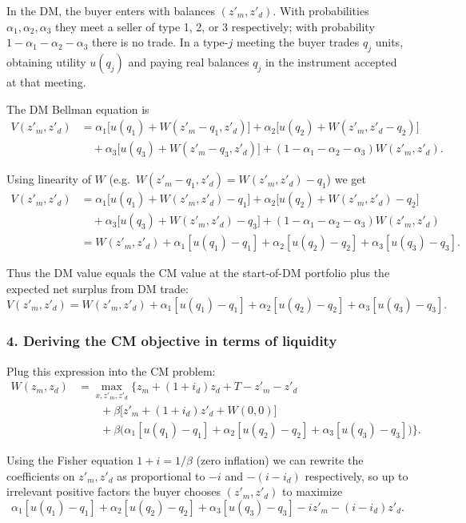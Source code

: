 \documentclass[11pt, a4paper]{article}
\begin{document}
In the DM, the buyer enters with balances $(z'_m,z'_d)$.  
With probabilities $\alpha_1,\alpha_2,\alpha_3$ they meet a seller of type 1, 2, or 3 respectively; with probability $1-\alpha_1-\alpha_2-\alpha_3$ there is no trade.  
In a type-$j$ meeting the buyer trades $q_j$ units, obtaining utility $u(q_j)$ and paying real balances $q_j$ in the instrument accepted at that meeting.

The DM Bellman equation is
\begin{align*}
V(z'_m,z'_d)
&= \alpha_1\bigl[u(q_1) + W(z'_m - q_1, z'_d)\bigr]
+ \alpha_2\bigl[u(q_2) + W(z'_m, z'_d - q_2)\bigr] \\
&\quad + \alpha_3\bigl[u(q_3) + W(z'_m - q_3, z'_d)\bigr]
+ (1-\alpha_1-\alpha_2-\alpha_3) W(z'_m,z'_d).
\end{align*}

Using linearity of $W$ (e.g.\ $W(z'_m - q_1,z'_d)=W(z'_m,z'_d)-q_1$) we get
\begin{align*}
V(z'_m,z'_d)
&= \alpha_1\bigl[u(q_1) + W(z'_m,z'_d) - q_1\bigr]
+ \alpha_2\bigl[u(q_2) + W(z'_m,z'_d) - q_2\bigr] \\
&\quad + \alpha_3\bigl[u(q_3) + W(z'_m,z'_d) - q_3\bigr]
+ (1-\alpha_1-\alpha_2-\alpha_3) W(z'_m,z'_d) \\
&= W(z'_m,z'_d)
+ \alpha_1[u(q_1)-q_1]
+ \alpha_2[u(q_2)-q_2]
+ \alpha_3[u(q_3)-q_3].
\end{align*}

Thus the DM value equals the CM value at the start-of-DM portfolio plus the expected net surplus from DM trade:
\[
V(z'_m,z'_d)
= W(z'_m,z'_d)
+ \alpha_1[u(q_1)-q_1]
+ \alpha_2[u(q_2)-q_2]
+ \alpha_3[u(q_3)-q_3].
\]

\subsubsection*{4. Deriving the CM objective in terms of liquidity}

Plug this expression into the CM problem:
\begin{align*}
W(z_m,z_d)
&= \max_{x,z'_m,z'_d}
\bigl\{ z_m + (1+i_d)z_d + T - z'_m - z'_d \\
&\qquad + \beta\bigl[z'_m + (1+i_d)z'_d + W(0,0)\bigr] \\
&\qquad + \beta\bigl(\alpha_1[u(q_1)-q_1]
+ \alpha_2[u(q_2)-q_2] + \alpha_3[u(q_3)-q_3]\bigr)
\bigr\}.
\end{align*}

Using the Fisher equation $1+i = 1/\beta$ (zero inflation) we can rewrite the coefficients on $z'_m,z'_d$ as proportional to $-i$ and $-(i-i_d)$ respectively, so up to irrelevant positive factors the buyer chooses $(z'_m,z'_d)$ to maximize
\[
\alpha_1[u(q_1)-q_1]
+ \alpha_2[u(q_2)-q_2]
+ \alpha_3[u(q_3)-q_3]
- i z'_m - (i - i_d) z'_d.
\]
\end{document}
